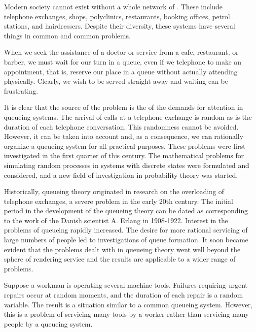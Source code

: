  Modern society cannot exist without
a whole network of . These include telephone
exchanges, shops, polyclinics, restaurants, booking offices, petrol
stations, and hairdressers.  Despite their diversity, these systems
have several things in common and common problems.

When we seek the assistance of a doctor or service from a cafe,
restaurant, or barber, we must wait for our turn in a queue, even if we
telephone to make an appointment, that is, reserve our place in a queue
without actually attending physically. Clearly, we wish to be served
straight away and waiting can be frustrating.

It is clear that the source of the problem is the  of the
demands for attention in queueing systems. The arrival of calls at
a telephone exchange is random as is the duration of each telephone
conversation. This randomness cannot be avoided. However, it can be
taken into account and, as a consequence, we can rationally organize
a queueing system for all practical purposes. These problems were first
investigated in the first quarter of this century. The mathematical
problems for simulating random processes in systems with discrete states
were formulated and considered, and a new ﬁeld of investigation in
probability theory was started.

Historically, queueing theory originated in research on the
overloading of telephone exchanges, a severe problem in the early 20th
century. The initial period in the development of the queueing theory
can be dated as corresponding to the work of the Danish scientist
A. Erlang in 1908-1922. Interest in the problems of queueing rapidly
increased. The desire for more rational servicing of large numbers of
people led to investigations of queue formation. It soon became
evident that the problems dealt with in queueing theory went well
beyond the sphere of rendering service and the results are applicable
to a wider range of problems.

Suppose a workman is operating several machine tools. Failures
requiring urgent repairs occur at random moments, and the duration of
each repair is a random variable. The result is a situation similar to
a common queueing system. However, this is a problem of servicing
many tools by a worker rather than servicing many people by
a queueing system.

